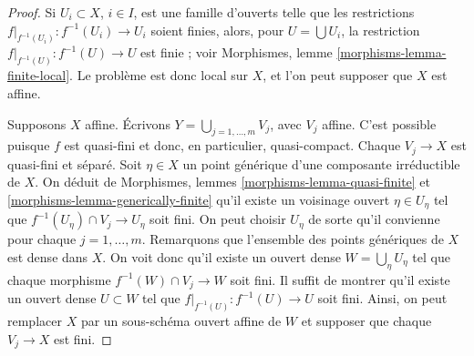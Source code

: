 \begin{proof}
Si $U_i \subset X$, $i \in I$, est une famille d'ouverts telle que les
restrictions $f|_{f^{-1}(U_i)} : f^{-1}(U_i) \to U_i$ soient finies,
alors, pour $U = \bigcup U_i$, la restriction $f|_{f^{-1}(U)} : f^{-1}(U) \to U$
est finie ; voir
Morphismes, lemme \ref{morphisms-lemma-finite-local}.
Le problème est donc local sur $X$, et l'on peut supposer que $X$ est affine.

\medskip\noindent
Supposons $X$ affine.
Écrivons $Y = \bigcup_{j = 1, \ldots, m} V_j$, avec $V_j$ affine.
C'est possible puisque $f$ est quasi-fini et donc, en
particulier, quasi-compact. Chaque $V_j \to X$ est quasi-fini
et séparé. Soit $\eta \in X$ un point générique d'une composante irréductible
de $X$. On déduit de
Morphismes, lemmes
\ref{morphisms-lemma-quasi-finite} et \ref{morphisms-lemma-generically-finite}
qu'il existe un voisinage ouvert $\eta \in U_\eta$ tel que
$f^{-1}(U_\eta) \cap V_j \to U_\eta$ soit fini. On peut choisir $U_\eta$ de sorte
qu'il convienne pour chaque $j = 1, \ldots, m$.
Remarquons que l'ensemble des points génériques de $X$ est dense dans $X$.
On voit donc qu'il existe un ouvert dense $W = \bigcup_\eta U_\eta$
tel que chaque morphisme $f^{-1}(W) \cap V_j \to W$ soit fini.
Il suffit de montrer qu'il existe un ouvert dense $U \subset W$
tel que $f|_{f^{-1}(U)} : f^{-1}(U) \to U$ soit fini.
Ainsi, on peut remplacer $X$ par un sous-schéma ouvert affine de $W$ et
supposer que chaque $V_j \to X$ est fini.


\end{proof}
